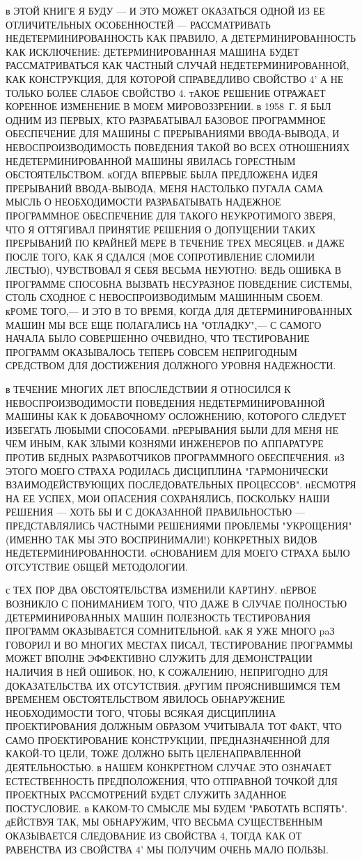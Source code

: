 в ЭТОЙ КНИГЕ Я БУДУ --- И ЭТО МОЖЕТ ОКАЗАТЬСЯ ОДНОЙ ИЗ ЕЕ ОТЛИЧИТЕЛЬНЫХ 
ОСОБЕННОСТЕЙ --- РАССМАТРИВАТЬ НЕДЕТЕРМИНИРОВАННОСТЬ КАК ПРАВИЛО, А 
ДЕТЕРМИНИРОВАННОСТЬ КАК ИСКЛЮЧЕНИЕ: ДЕТЕРМИНИРОВАННАЯ МАШИНА БУДЕТ 
РАССМАТРИВАТЬСЯ КАК ЧАСТНЫЙ СЛУЧАЙ НЕДЕТЕРМИНИРОВАННОЙ, КАК КОНСТРУКЦИЯ, 
ДЛЯ КОТОРОЙ СПРАВЕДЛИВО СВОЙСТВО 4' А НЕ ТОЛЬКО БОЛЕЕ СЛАБОЕ СВОЙСТВО 4. 
тАКОЕ РЕШЕНИЕ ОТРАЖАЕТ КОРЕННОЕ ИЗМЕНЕНИЕ В МОЕМ МИРОВОЗЗРЕНИИ. в 
1958~Г. Я БЫЛ ОДНИМ ИЗ ПЕРВЫХ, КТО РАЗРАБАТЫВАЛ БАЗОВОЕ ПРОГРАММНОЕ 
ОБЕСПЕЧЕНИЕ ДЛЯ МАШИНЫ С ПРЕРЫВАНИЯМИ ВВОДА-ВЫВОДА, И 
НЕВОСПРОИЗВОДИМОСТЬ ПОВЕДЕНИЯ ТАКОЙ ВО ВСЕХ ОТНОШЕНИЯХ 
НЕДЕТЕРМИНИРОВАННОЙ МАШИНЫ ЯВИЛАСЬ ГОРЕСТНЫМ ОБСТОЯТЕЛЬСТВОМ. кОГДА 
ВПЕРВЫЕ БЫЛА ПРЕДЛОЖЕНА ИДЕЯ ПРЕРЫВАНИЙ ВВОДА-ВЫВОДА, МЕНЯ НАСТОЛЬКО 
ПУГАЛА САМА МЫСЛЬ О НЕОБХОДИМОСТИ РАЗРАБАТЫВАТЬ НАДЕЖНОЕ ПРОГРАММНОЕ 
ОБЕСПЕЧЕНИЕ ДЛЯ ТАКОГО НЕУКРОТИМОГО ЗВЕРЯ, ЧТО Я ОТТЯГИВАЛ ПРИНЯТИЕ 
РЕШЕНИЯ О ДОПУЩЕНИИ ТАКИХ ПРЕРЫВАНИЙ ПО КРАЙНЕЙ МЕРЕ В ТЕЧЕНИЕ ТРЕХ 
МЕСЯЦЕВ. и ДАЖЕ ПОСЛЕ ТОГО, КАК Я СДАЛСЯ (МОЕ СОПРОТИВЛЕНИЕ СЛОМИЛИ 
ЛЕСТЬЮ), ЧУВСТВОВАЛ Я СЕБЯ ВЕСЬМА НЕУЮТНО: ВЕДЬ ОШИБКА В ПРОГРАММЕ 
СПОСОБНА ВЫЗВАТЬ НЕСУРАЗНОЕ ПОВЕДЕНИЕ СИСТЕМЫ, СТОЛЬ СХОДНОЕ С 
НЕВОСПРОИЗВОДИМЫМ МАШИННЫМ СБОЕМ. кРОМЕ ТОГО,--- И ЭТО В ТО ВРЕМЯ, КОГДА 
ДЛЯ ДЕТЕРМИНИРОВАННЫХ МАШИН МЫ ВСЕ ЕЩЕ ПОЛАГАЛИСЬ НА "ОТЛАДКУ",--- С 
САМОГО НАЧАЛА БЫЛО СОВЕРШЕННО ОЧЕВИДНО, ЧТО ТЕСТИРОВАНИЕ ПРОГРАММ 
ОКАЗЫВАЛОСЬ ТЕПЕРЬ СОВСЕМ НЕПРИГОДНЫМ СРЕДСТВОМ ДЛЯ ДОСТИЖЕНИЯ ДОЛЖНОГО 
УРОВНЯ НАДЕЖНОСТИ.

в ТЕЧЕНИЕ МНОГИХ ЛЕТ ВПОСЛЕДСТВИИ Я ОТНОСИЛСЯ К НЕВОСПРОИЗВОДИМОСТИ 
ПОВЕДЕНИЯ НЕДЕТЕРМИНИРОВАННОЙ МАШИНЫ КАК К ДОБАВОЧНОМУ ОСЛОЖНЕНИЮ, 
КОТОРОГО СЛЕДУЕТ ИЗБЕГАТЬ ЛЮБЫМИ СПОСОБАМИ. пРЕРЫВАНИЯ БЫЛИ ДЛЯ МЕНЯ НЕ 
ЧЕМ ИНЫМ, КАК ЗЛЫМИ КОЗНЯМИ ИНЖЕНЕРОВ ПО АППАРАТУРЕ ПРОТИВ БЕДНЫХ 
РАЗРАБОТЧИКОВ ПРОГРАММНОГО ОБЕСПЕЧЕНИЯ. иЗ ЭТОГО МОЕГО СТРАХА РОДИЛАСЬ 
ДИСЦИПЛИНА "ГАРМОНИЧЕСКИ ВЗАИМОДЕЙСТВУЮЩИХ ПОСЛЕДОВАТЕЛЬНЫХ ПРОЦЕССОВ". 
нЕСМОТРЯ НА ЕЕ УСПЕХ, МОИ ОПАСЕНИЯ СОХРАНЯЛИСЬ, ПОСКОЛЬКУ НАШИ РЕШЕНИЯ
--- ХОТЬ БЫ И С ДОКАЗАННОЙ ПРАВИЛЬНОСТЬЮ --- ПРЕДСТАВЛЯЛИСЬ ЧАСТНЫМИ 
РЕШЕНИЯМИ ПРОБЛЕМЫ "УКРОЩЕНИЯ" (ИМЕННО ТАК  МЫ  ЭТО ВОСПРИНИМАЛИ!) 
КОНКРЕТНЫХ ВИДОВ НЕДЕТЕРМИНИРОВАННОСТИ. оСНОВАНИЕМ ДЛЯ МОЕГО СТРАХА БЫЛО 
ОТСУТСТВИЕ ОБЩЕЙ МЕТОДОЛОГИИ.

с ТЕХ ПОР ДВА ОБСТОЯТЕЛЬСТВА ИЗМЕНИЛИ КАРТИНУ. пЕРВОЕ ВОЗНИКЛО С 
ПОНИМАНИЕМ ТОГО, ЧТО ДАЖЕ В СЛУЧАЕ ПОЛНОСТЬЮ ДЕТЕРМИНИРОВАННЫХ МАШИН 
ПОЛЕЗНОСТЬ ТЕСТИРОВАНИЯ ПРОГРАММ ОКАЗЫВАЕТСЯ СОМНИТЕЛЬНОЙ. кАК Я УЖЕ 
МНОГО paЗ ГОВОРИЛ И ВО МНОГИХ МЕСТАХ ПИСАЛ, ТЕСТИРОВАНИЕ ПРОГРАММЫ МОЖЕТ 
ВПОЛНЕ ЭФФЕКТИВНО СЛУЖИТЬ ДЛЯ ДЕМОНСТРАЦИИ НАЛИЧИЯ В НЕЙ ОШИБОК, НО, К 
СОЖАЛЕНИЮ, НЕПРИГОДНО ДЛЯ ДОКАЗАТЕЛЬСТВА ИХ ОТСУТСТВИЯ. дРУГИМ 
ПРОЯСНИВШИМСЯ ТЕМ ВРЕМЕНЕМ ОБСТОЯТЕЛЬСТВОМ ЯВИЛОСЬ ОБНАРУЖЕНИЕ 
НЕОБХОДИМОСТИ ТОГО, ЧТОБЫ ВСЯКАЯ ДИСЦИПЛИНА ПРОЕКТИРОВАНИЯ ДОЛЖНЫМ 
ОБРАЗОМ УЧИТЫВАЛА ТОТ ФАКТ, ЧТО САМО ПРОЕКТИРОВАНИЕ КОНСТРУКЦИИ, 
ПРЕДНАЗНАЧЕННОЙ ДЛЯ КАКОЙ-ТО ЦЕЛИ, ТОЖЕ ДОЛЖНО БЫТЬ ЦЕЛЕНАПРАВЛЕННОЙ 
ДЕЯТЕЛЬНОСТЬЮ. в НАШЕМ КОНКРЕТНОМ СЛУЧАЕ ЭТО ОЗНАЧАЕТ ЕСТЕСТВЕННОСТЬ 
ПРЕДПОЛОЖЕНИЯ, ЧТО ОТПРАВНОЙ ТОЧКОЙ ДЛЯ ПРОЕКТНЫХ РАССМОТРЕНИЙ БУДЕТ 
СЛУЖИТЬ ЗАДАННОЕ ПОСТУСЛОВИЕ. в КАКОМ-ТО СМЫСЛЕ МЫ БУДЕМ "РАБОТАТЬ 
ВСПЯТЬ". дЕЙСТВУЯ ТАК, МЫ ОБНАРУЖИМ, ЧТО ВЕСЬМА СУЩЕСТВЕННЫМ ОКАЗЫВАЕТСЯ 
СЛЕДОВАНИЕ ИЗ СВОЙСТВА 4, ТОГДА КАК ОТ РАВЕНСТВА ИЗ СВОЙСТВА 4' МЫ 
ПОЛУЧИМ ОЧЕНЬ МАЛО ПОЛЬЗЫ.

